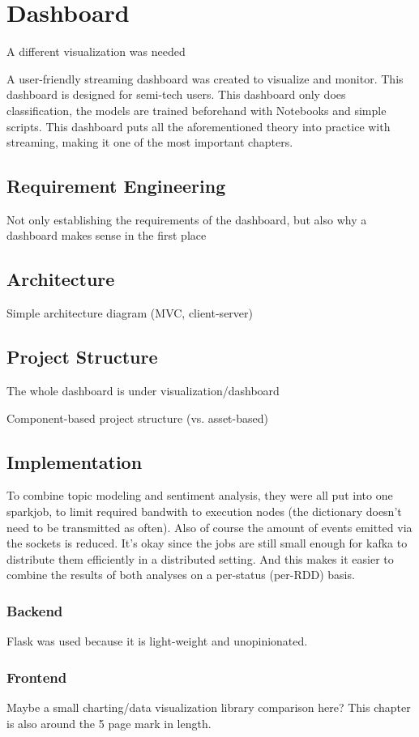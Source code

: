 \chapter{Dashboard}

A different visualization was needed

\label{ch:dashboard}

A user-friendly streaming dashboard was created to visualize and monitor.
This dashboard is designed for semi-tech users.
This dashboard only does classification, the models are trained beforehand with Notebooks and simple scripts.
This dashboard puts all the aforementioned theory into practice with streaming, making it one of the most important chapters.

\section{Requirement Engineering}
\label{sec:requirementEngineering}

Not only establishing the requirements of the dashboard, but also why a dashboard makes sense in the first place

\section{Architecture}
\label{sec:architecture}

Simple architecture diagram (MVC, client-server)

\section{Project Structure}
\label{sec:projectStructure}

The whole dashboard is under visualization/dashboard

Component-based project structure (vs. asset-based)

\section{Implementation}
\label{sec:implementation}

To combine topic modeling and sentiment analysis, they were all put into one sparkjob, to limit required bandwith to execution nodes (the dictionary doesn't need to be transmitted as often).
Also of course the amount of events emitted via the sockets is reduced.
It's okay since the jobs are still small enough for kafka to distribute them efficiently in a distributed setting.
And this makes it easier to combine the results of both analyses on a per-status (per-RDD) basis.

\subsection{Backend}
\label{subsec:backend}

Flask was used because it is light-weight and unopinionated.

\subsection{Frontend}
\label{subsec:frontend}

Maybe a small charting/data visualization library comparison here?
This chapter is also around the 5 page mark in length.
\pagebreak[5]